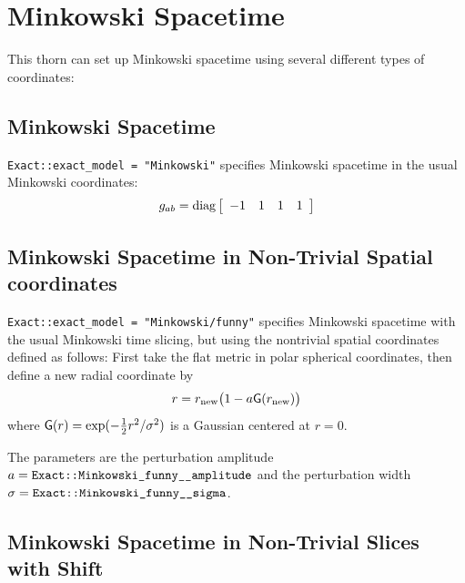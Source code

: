 
\section{Minkowski Spacetime}

This thorn can set up Minkowski spacetime using several different
types of coordinates:


\subsection{Minkowski Spacetime}

\verb|Exact::exact_model = "Minkowski"| specifies Minkowski spacetime
in the usual Minkowski coordinates:
\begin{equation}
g_{ab} = \diag \left[
	 \begin{array}{cccc}
	 -1	& 1	& 1	& 1	%
	 \end{array}
	 \right]
\end{equation}


\subsection{Minkowski Spacetime in Non-Trivial Spatial coordinates}

\verb|Exact::exact_model = "Minkowski/funny"| specifies Minkowski spacetime
with the usual Minkowski time slicing, but using the nontrivial spatial
coordinates defined as follows:  First take the flat metric in polar
spherical coordinates, then define a new radial coordinate by
\begin{equation}
r = r_\text{new} \big(1 - a {\sf G}(r_\text{new})\big)
\end{equation}
where 
${\sf G}(r) = \exp(-{\textstyle \frac{1}{2}} r^2/\sigma^2)$ is a Gaussian centered at $r=0$.

The parameters are the perturbation amplitude
$a = \verb|Exact::Minkowski_funny__amplitude|$
and the perturbation width $\sigma = \verb|Exact::Minkowski_funny__sigma|$.


\subsection{Minkowski Spacetime in Non-Trivial Slices with Shift}

